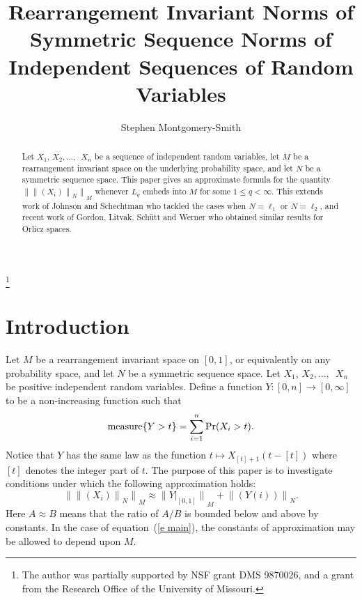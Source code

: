 \documentclass[12pt]{amsart}
\newcommand{\snormo}[1]{{\mathopen\|#1\mathclose\|}}
\newcommand{\measure}{\text{\rm measure}}
\begin{document}
\title[R.i. norms of symmetric sequence norms]
{Rearrangement Invariant Norms of Symmetric Sequence Norms
of Independent Sequences of Random Variables
}

\author{Stephen Montgomery-Smith}
\makeatletter
\address{Department of Mathematics\\
University of Missouri\\
Columbia, MO 65211}
\thanks{The author was 
partially supported
by NSF grant DMS 9870026, and a grant from the Research Office of the
University of Missouri.}

\begin{abstract}
\noindent
Let $X_1$, $X_2,\dots,$\ $X_n$ be a sequence of independent random
variables, let $M$ be a rearrangement invariant space on the underlying
probability space, and let $N$ be a symmetric sequence space.  This paper
gives an approximate formula for the quantity
$\snormo{\snormo{(X_i)}_N}_M$ whenever $L_q$ embeds into $M$ for some
$1 \le q < \infty$.
This extends work of Johnson and Schechtman who tackled the cases when
$N = \ell_1$ or $N = \ell_2$, and
recent work of Gordon, Litvak, Sch\"utt and Werner who obtained
similar results for Orlicz spaces.
\end{abstract}

\maketitle

\section{Introduction}

Let $M$ be a rearrangement invariant space on $[0,1]$, or equivalently
on any probability space, and let $N$ be a symmetric sequence space.
Let $X_1$, $X_2, \dots,$\ $X_n$ be positive independent random variables.
Define a function $Y:[0,n] \to [0,\infty]$ to be a non-increasing
function such that
\[ \measure\{Y > t \} = \sum_{i=1}^n \Pr(X_i > t) . \]
Notice that $Y$ has the same law as the function 
$t \mapsto X_{[t]+1}(t-[t])$ where $[t]$ denotes the integer part of $t$.
The purpose of this paper is to investigate conditions under which
the following approximation holds:
\begin{equation}
\label{e main}
   \snormo{\snormo{(X_i)}_N}_M \approx
   \snormo{Y|_{[0,1]}}_M + \snormo{(Y(i))}_N .
\end{equation}
Here $A \approx B$ means that the ratio of $A/B$ is bounded below
and above by constants.  In the case of equation~(\ref{e main}), the
constants of approximation may be allowed to depend upon $M$.
\end{document}
